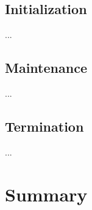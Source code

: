 \subsection{Initialization}
...

\subsection{Maintenance}
...

\subsection{Termination}
...

\section{Summary}
\label{ch:definitions|sec:asymptotic-notation|sec:summary}

